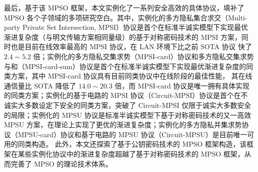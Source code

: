\begin{cnabstract}
    最后，基于该 MPSO 框架，本文实例化了一系列安全高效的具体协议，填补了 MPSO 各个子领域的多项研究空白。其中，实例化的多方隐私集合求交（Multi-party Private Set Intersection, MPSI）协议是首个在标准半诚实模型下实现最优渐进复杂度（与明文传输方案相同量级）的基于对称密码技术的 MPSI 方案，同时也是目前在线效率最高的 MPSI 协议，在 LAN 环境下比之前 SOTA 协议 \cite{WuYC24} 快了 $2.4 \sim 5.2$ 倍；实例化的多方隐私交集求势（MPSI-card）协议和多方隐私交集求势与和（MPSI-card-sum）协议是首个在标准半诚实模型下实现最优渐进复杂度的同类方案，其中 MPSI-card 协议具有目前同类协议中在线阶段的最佳性能， 其在线通信量比 SOTA \cite{ChenDGB22} 降低了 $14.0 \sim 20.3$ 倍，而 MPSI-card 协议是唯一拥有具体实现的同类方案；实例化的基于电路的 MPSI 协议（Circuit-MPSI）协议是首个在不诚实大多数设定下安全的同类方案，突破了 Circuit-MPSI 仅限于诚实大多数安全的局限；实例化的 MPSU 协议是标准半诚实模型下基于对称密码技术的又一高效 MPSU 方案，在理论上实现了更优的渐进复杂度；实例化的多方隐私并集求势协议（MPSU-card）协议和基于电路的 MPSU 协议（Circuit-MPSU）是目前唯一可用的同类构造。
    此外，本文还探索了基于公钥密码技术的 MPSO 框架构造，该框架在某些实例化协议中的渐进复杂度超越了基于对称密码技术的 MPSO 框架，从而完善了 MPSO 的理论技术体系。


\end{cnabstract}

